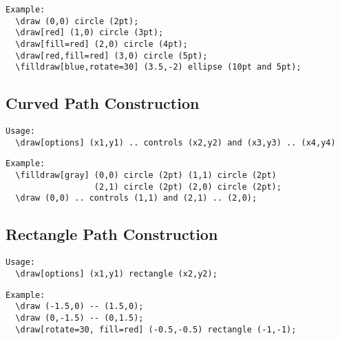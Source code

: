 \documentclass[a4paper,12pt]{article}
\begin{document}
\begin{verbatim}
Example:
  \draw (0,0) circle (2pt);
  \draw[red] (1,0) circle (3pt);
  \draw[fill=red] (2,0) circle (4pt);
  \draw[red,fill=red] (3,0) circle (5pt);
  \filldraw[blue,rotate=30] (3.5,-2) ellipse (10pt and 5pt);
\end{verbatim}


\subsection{Curved Path Construction}
\begin{verbatim}
Usage:
  \draw[options] (x1,y1) .. controls (x2,y2) and (x3,y3) .. (x4,y4)
\end{verbatim}

\begin{verbatim}
Example:
  \filldraw[gray] (0,0) circle (2pt) (1,1) circle (2pt)
                  (2,1) circle (2pt) (2,0) circle (2pt);
  \draw (0,0) .. controls (1,1) and (2,1) .. (2,0);
\end{verbatim}


\subsection{Rectangle Path Construction}
\begin{verbatim}
Usage:
  \draw[options] (x1,y1) rectangle (x2,y2);
\end{verbatim}

\begin{verbatim}
Example:
  \draw (-1.5,0) -- (1.5,0);
  \draw (0,-1.5) -- (0,1.5);
  \draw[rotate=30, fill=red] (-0.5,-0.5) rectangle (-1,-1);
\end{verbatim}

\end{document}
